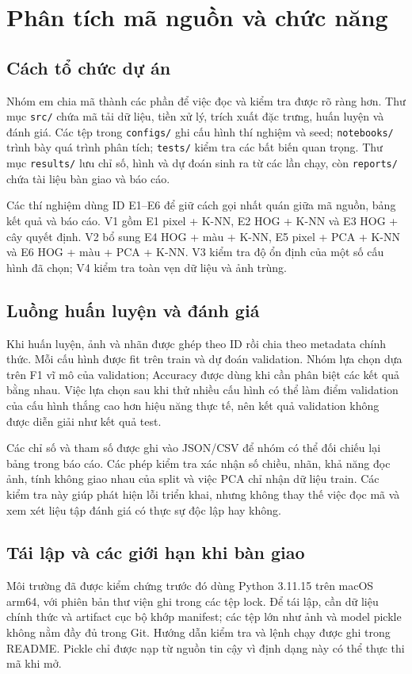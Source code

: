 \chapter{Phân tích mã nguồn và chức năng}
\section{Cách tổ chức dự án}
Nhóm em chia mã thành các phần để việc đọc và kiểm tra được rõ ràng hơn. Thư mục \texttt{src/} chứa mã tải dữ liệu, tiền xử lý, trích xuất đặc trưng, huấn luyện và đánh giá. Các tệp trong \texttt{configs/} ghi cấu hình thí nghiệm và seed; \texttt{notebooks/} trình bày quá trình phân tích; \texttt{tests/} kiểm tra các bất biến quan trọng. Thư mục \texttt{results/} lưu chỉ số, hình và dự đoán sinh ra từ các lần chạy, còn \texttt{reports/} chứa tài liệu bàn giao và báo cáo.

Các thí nghiệm dùng ID E1–E6 để giữ cách gọi nhất quán giữa mã nguồn, bảng kết quả và báo cáo. V1 gồm E1 pixel + K-NN, E2 HOG + K-NN và E3 HOG + cây quyết định. V2 bổ sung E4 HOG + màu + K-NN, E5 pixel + PCA + K-NN và E6 HOG + màu + PCA + K-NN. V3 kiểm tra độ ổn định của một số cấu hình đã chọn; V4 kiểm tra toàn vẹn dữ liệu và ảnh trùng.
\section{Luồng huấn luyện và đánh giá}
Khi huấn luyện, ảnh và nhãn được ghép theo ID rồi chia theo metadata chính thức. Mỗi cấu hình được fit trên train và dự đoán validation. Nhóm lựa chọn dựa trên F1 vĩ mô của validation; Accuracy được dùng khi cần phân biệt các kết quả bằng nhau. Việc lựa chọn sau khi thử nhiều cấu hình có thể làm điểm validation của cấu hình thắng cao hơn hiệu năng thực tế, nên kết quả validation không được diễn giải như kết quả test.

Các chỉ số và tham số được ghi vào JSON/CSV để nhóm có thể đối chiếu lại bảng trong báo cáo. Các phép kiểm tra xác nhận số chiều, nhãn, khả năng đọc ảnh, tính không giao nhau của split và việc PCA chỉ nhận dữ liệu train. Các kiểm tra này giúp phát hiện lỗi triển khai, nhưng không thay thế việc đọc mã và xem xét liệu tập đánh giá có thực sự độc lập hay không.
\section{Tái lập và các giới hạn khi bàn giao}
Môi trường đã được kiểm chứng trước đó dùng Python 3.11.15 trên macOS arm64, với phiên bản thư viện ghi trong các tệp lock. Để tái lập, cần dữ liệu chính thức và artifact cục bộ khớp manifest; các tệp lớn như ảnh và model pickle không nằm đầy đủ trong Git. Hướng dẫn kiểm tra và lệnh chạy được ghi trong README. Pickle chỉ được nạp từ nguồn tin cậy vì định dạng này có thể thực thi mã khi mở.

